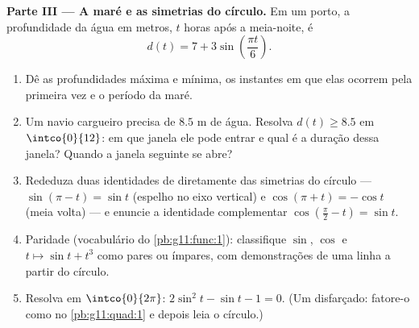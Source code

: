 \begin{problem}
\medskip
\noindent\textbf{Parte III --- A maré e as simetrias do
círculo.}
Em um porto, a profundidade da água em metros, $t$ horas após a
meia-noite, é
\[
d(t) = 7 + 3 \sin\!\left(\frac{\pi t}{6}\right).
\]
\begin{enumerate}[resume]
  \item Dê as profundidades máxima e mínima, os instantes em que
        elas ocorrem pela primeira vez e o período da maré.
  \item Um navio cargueiro precisa de $8.5$ m de água. Resolva
        $d(t) \geq 8.5$ em $\intco{0}{12}$: em que janela ele
        pode entrar e qual é a duração dessa janela? Quando a
        janela seguinte se abre?
  \item Rededuza duas identidades de 
        diretamente das simetrias do círculo ---
        $\sin(\pi - t) = \sin t$ (espelho no eixo vertical) e
        $\cos(\pi + t) = -\cos t$ (meia volta) --- e enuncie a
        identidade complementar
        $\cos\left(\frac\pi2 - t\right) = \sin t$.
  \item Paridade (vocabulário do \cref{pb:g11:func:1}):
        classifique $\sin$, $\cos$ e $t \mapsto \sin t + t^3$
        como pares ou ímpares, com demonstrações de uma linha a
        partir do círculo.
  \item Resolva em $\intco{0}{2\pi}$: $2\sin^2 t - \sin t - 1 =
        0$. (Um  disfarçado: fatore-o
        como no \cref{pb:g11:quad:1} e depois leia o círculo.)
\end{enumerate}


\end{problem}
